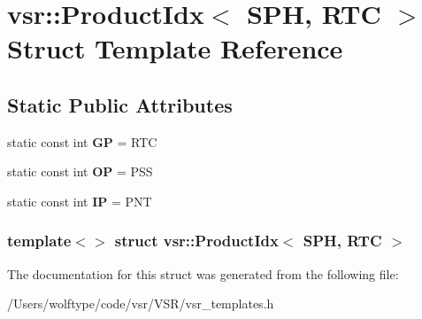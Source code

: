 \hypertarget{structvsr_1_1_product_idx_3_01_s_p_h_00_01_r_t_c_01_4}{\section{vsr\-:\-:Product\-Idx$<$ S\-P\-H, R\-T\-C $>$ Struct Template Reference}
\label{structvsr_1_1_product_idx_3_01_s_p_h_00_01_r_t_c_01_4}
}
\subsection*{Static Public Attributes}
\begin{DoxyCompactItemize}
\item 
\hypertarget{structvsr_1_1_product_idx_3_01_s_p_h_00_01_r_t_c_01_4_ad2276fafacb251d185f0f9ceecaae84f}{static const int {\bfseries G\-P} = R\-T\-C}\label{structvsr_1_1_product_idx_3_01_s_p_h_00_01_r_t_c_01_4_ad2276fafacb251d185f0f9ceecaae84f}

\item 
\hypertarget{structvsr_1_1_product_idx_3_01_s_p_h_00_01_r_t_c_01_4_a73dfe33b58ffe36a70977e5872c7249d}{static const int {\bfseries O\-P} = P\-S\-S}\label{structvsr_1_1_product_idx_3_01_s_p_h_00_01_r_t_c_01_4_a73dfe33b58ffe36a70977e5872c7249d}

\item 
\hypertarget{structvsr_1_1_product_idx_3_01_s_p_h_00_01_r_t_c_01_4_a7139af1da3811737f155a798b62fa619}{static const int {\bfseries I\-P} = P\-N\-T}\label{structvsr_1_1_product_idx_3_01_s_p_h_00_01_r_t_c_01_4_a7139af1da3811737f155a798b62fa619}

\end{DoxyCompactItemize}
\subsubsection*{template$<$$>$ struct vsr\-::\-Product\-Idx$<$ S\-P\-H, R\-T\-C $>$}



The documentation for this struct was generated from the following file\-:\begin{DoxyCompactItemize}
\item 
/\-Users/wolftype/code/vsr/\-V\-S\-R/vsr\-\_\-templates.\-h\end{DoxyCompactItemize}
